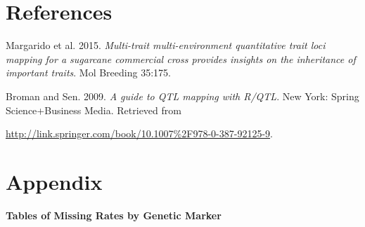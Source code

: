 \documentclass[11pt]{article}\usepackage[]{graphicx}\usepackage[]{color}
\begin{document}
{\newpage
\section*{References}
\setlength{\parindent}{-0.2in}
\setlength{\leftskip}{0.2in}
\setlength{\parskip}{3pt}
\noindent

Margarido et al. 2015. {\it Multi-trait multi-environment quantitative trait loci mapping for a sugarcane commercial cross provides insights on the inheritance of important traits}. Mol Breeding 35:175.

Broman and Sen. 2009. {\it A guide to QTL mapping with R/QTL}. New York: Spring Science+Business Media. Retrieved from 

\url{http://link.springer.com/book/10.1007%2F978-0-387-92125-9}.

\setlength{\parindent}{0in}
\setlength{\leftskip}{0in}
\setlength{\parskip}{8pt}

\newpage


\section*{Appendix}
{\bf Tables of Missing Rates by Genetic Marker}

}
\end{document}
